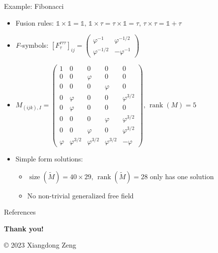\documentclass{fdubeamer}
\newcommand{\1}{\mathbb{1}}
\DeclareMathOperator{\rank}{rank}
\begin{document}
\begin{frame}{Example: Fibonacci}

\begin{itemize}
  \item Fusion rules: $
      \1 \times \1 = \1, \,
      \1 \times \tau = \tau \times \1 = \tau, \,
      \tau \times \tau = \1 + \tau
    $
  \item \textit{F}-symbols: $
      [F^{\tau\tau\tau}_\tau]_{ij} = \left( \begin{smallmatrix}
        \varphi^{-1}   &  \varphi^{-1/2} \\
        \varphi^{-1/2} & -\varphi^{-1}
      \end{smallmatrix} \right)
    $ \\[1ex]
  \item $
      M_{(ijk), I} = \left( \begin{smallmatrix}
        1 & 0 & 0 & 0 & 0 \\
        0 & 0 & \varphi & 0 & 0 \\
        0 & 0 & 0 & \varphi & 0 \\
        0 & \varphi & 0 & 0 & \varphi^{3/2} \\
        0 & \varphi & 0 & 0 & 0 \\
        0 & 0 & 0 & \varphi & \varphi^{3/2} \\
        0 & 0 & \varphi & 0 & \varphi^{3/2} \\
        \varphi & \varphi^{3/2} & \varphi^{3/2} & \varphi^{3/2} & -\varphi
      \end{smallmatrix} \right)\!, \,
      \rank(M) = 5
    $ \\[1ex]

  \item Simple form solutions:

    \begin{itemize}
      \item $\operatorname{size}(\tilde{M})=40\times29, \, \rank(\tilde{M})=28$
        \textrightarrow{} only has one solution
      \item No non-trivial generalized free field
    \end{itemize}
\end{itemize}

\end{frame}

\begin{frame}{References}
  \tiny
  
\end{frame}

\begingroup
  \begin{frame}[plain]
    \vfill
    \begin{center}
      \color{white}
      \LARGE
      \textbf{Thank you!} \par
      \vspace{6em}
      \tiny
      \copyright{} 2023 Xiangdong Zeng
    \end{center}
    \vspace{-8em}
  \end{frame}
\endgroup
\end{document}
